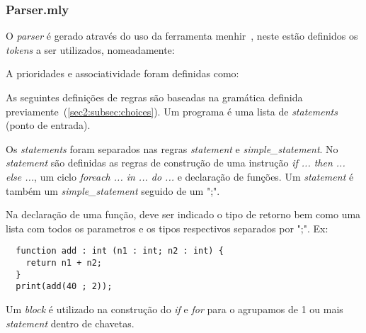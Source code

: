 \subsubsection{Parser.mly}
\label{sec2:subsubsec:parser}

O \textit{parser} é gerado através do uso da ferramenta menhir~\cite{menhir}, neste estão definidos os \textit{tokens} a ser utilizados, nomeadamente:



A prioridades e associatividade foram definidas como:


\clearpage

As seguintes definições de regras são baseadas na gramática definida previamente~(\ref{sec2:subsec:choices}). Um programa é uma lista de \textit{statements} (ponto de entrada).



Os \textit{statements} foram separados nas regras \textit{statement} e \textit{simple\_statement}. No \textit{statement} são definidas as regras de construção de uma instrução \textit{if ... then ... else ...}, um ciclo \textit{foreach ... in ... do ...} e declaração de funções. Um \textit{statement} é também um \textit{simple\_statement} seguido de um ";".



Na declaração de uma função, deve ser indicado o tipo de retorno bem como uma lista com todos os parametros e os tipos respectivos separados por ";". Ex:

\begin{lstlisting}
  function add : int (n1 : int; n2 : int) {
    return n1 + n2;
  }
  print(add(40 ; 2));
\end{lstlisting}





Um \textit{block} é utilizado na construção do \textit{if} e \textit{for} para o agrupamos de 1 ou mais \textit{statement} dentro de chavetas.



